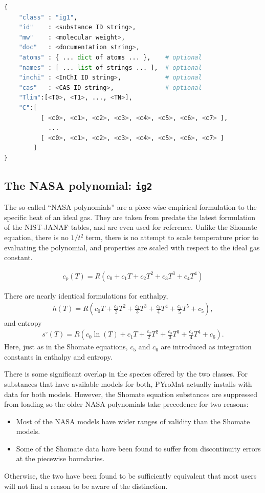 \begin{lstlisting}[language=Python]
{
    "class" : "ig1",
    "id"    : <substance ID string>,
    "mw"    : <molecular weight>,
    "doc"   : <documentation string>,
    "atoms" : { ... dict of atoms ... },    # optional
    "names" : [ ... list of strings ... ],  # optional
    "inchi" : <InChI ID string>,            # optional
    "cas"   : <CAS ID string>,              # optional
    "Tlim":[<T0>, <T1>, ..., <TN>],
    "C":[
          [ <c0>, <c1>, <c2>, <c3>, <c4>, <c5>, <c6>, <c7> ],
            ...
          [ <c0>, <c1>, <c2>, <c3>, <c4>, <c5>, <c6>, <c7> ]
        ]
}
\end{lstlisting}


\subsection{The NASA polynomial: \texttt{ig2}}\label{sec:ig:ig2}

The so-called ``NASA polynomials'' are a piece-wise empirical formulation to the specific heat of an ideal gas.  They are taken from \cite{mcbride:1993} predate the latest formulation of the NIST-JANAF tables, and are even used for reference.  Unlike the Shomate equation, there is no $1/t^2$ term, there is no attempt to scale temperature prior to evaluating the polynomial, and properties are scaled with respect to the ideal gas constant.

\begin{align}
c_p(T) = R\left(c_0 + c_1 T + c_2 T^2 + c_3 T^3 + c_4 T^4\right)
\end{align}

There are nearly identical formulations for enthalpy,
\begin{align}
h(T) = R \left(c_0 T + \frac{c_1}{2} T^2 + \frac{c_2}{3} T^3 + \frac{c_3}{4} T^4 + \frac{c_4}{5}T^5 + c_5 \right),
\end{align}
and entropy
\begin{align}
s^\circ(T) = R \left(c_0 \ln(T) + c_1 T + \frac{c_2}{2} T^2 + \frac{c_3}{3} T^3 + \frac{c_4}{4} T^4 + c_6\right).
\end{align}
Here, just as in the Shomate equations, $c_5$ and $c_6$ are introduced as integration constants in enthalpy and entropy.

There is some significant overlap in the species offered by the two classes.  For substances that have available models for both, PYroMat actually installs with data for both models.  However, the Shomate equation substances are suppressed from loading so the older NASA polynomials take precedence for two reasons:
\begin{itemize}
\item Most of the NASA models have wider ranges of validity than the Shomate models.
\item Some of the Shomate data have been found to suffer from discontinuity errors at the piecewise boundaries.
\end{itemize}
Otherwise, the two have been found to be sufficiently equivalent that most users will not find a reason to be aware of the distinction.

